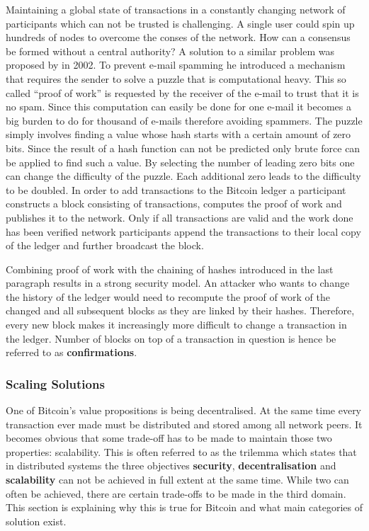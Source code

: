 \documentclass[final]{fhnwreport}       %
\begin{document}
Maintaining a global state of transactions in a constantly changing network of participants which can not be trusted is challenging. A single user could spin up hundreds of nodes to overcome the conses of the network. How can a consensus be formed without a central authority? A solution to a similar problem was proposed by \textcite{back_hashcash_2002} in 2002. To prevent e-mail spamming he introduced a mechanism that requires the sender to solve a puzzle that is computational heavy. This so called ``proof of work'' is requested by the receiver of the e-mail to trust that it is no spam. Since this computation can easily be done for one e-mail it becomes a big burden to do for thousand of e-mails therefore avoiding spammers. The puzzle simply involves finding a value whose hash starts with a certain amount of zero bits. Since the result of a hash function can not be predicted only brute force can be applied to find such a value. By selecting the number of leading zero bits one can change the difficulty of the puzzle. Each additional zero leads to the difficulty to be doubled. In order to add transactions to the Bitcoin ledger a participant constructs a block consisting of transactions, computes the proof of work and publishes it to the network. Only if all transactions are valid and the work done has been verified network participants append the transactions to their local copy of the ledger and further broadcast the block.  

Combining proof of work with the chaining of hashes introduced in the last paragraph results in a strong security model. An attacker who wants to change the history of the ledger would need to recompute the proof of work of the changed and all subsequent blocks as they are linked by their hashes. Therefore, every new block makes it increasingly more difficult to change a transaction in the ledger. Number of blocks on top of a transaction in question is hence be referred to as \textbf{confirmations}.  

\subsubsection{Scaling Solutions}
One of Bitcoin's value propositions is being decentralised. At the same time every transaction ever made must be distributed and stored among all network peers. It becomes obvious that some trade-off has to be made to maintain those two properties: scalability. This is often referred to as the \gls{trilemma} which states that in distributed systems the three objectives \textbf{security}, \textbf{decentralisation} and \textbf{scalability} can not be achieved in full extent at the same time. While two can often be achieved, there are certain trade-offs to be made in the third domain. This section is explaining why this is true for Bitcoin and what main categories of solution exist.
\end{document}
